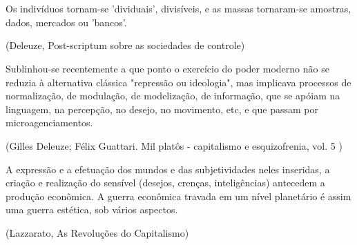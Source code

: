\chapter*{}

\vspace*{\fill}

\thispagestyle{empty}

\epigraph{Os indivíduos tornam-se 'dividuais', divisíveis, e as massas
tornaram-se amostras, dados, mercados ou 'bancos'.}{(Deleuze, Post-scriptum sobre as sociedades de controle)}

\epigraph{Sublinhou-se recentemente a que ponto o exercício do poder moderno não
se reduzia à alternativa clássica "repressão ou ideologia", mas
implicava processos de normalização, de modulação, de modelização, de
informação, que se apóiam na linguagem, na percepção, no desejo, no
movimento, etc, e que passam por microagenciamentos.}{(Gilles Deleuze; Félix Guattari. Mil platôs - capitalismo e
esquizofrenia, vol. 5 )}

\epigraph{A expressão e a efetuação dos mundos e das subjetividades neles
inseridas, a criação e realização do sensível (desejos, crenças,
inteligências) antecedem a produção econômica. A guerra econômica
travada em um nível planetário é assim uma guerra estética, sob vários
aspectos.}{(Lazzarato, As Revoluções do Capitalismo)}
